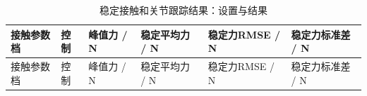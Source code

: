 \FloatBarrier\begingroup\small\setlength{\tabcolsep}{2.5pt}
\begin{longtable}[]{@{}
  >{\raggedright\arraybackslash}p{}
  >{\raggedright\arraybackslash}p{}
  >{\raggedright\arraybackslash}p{}
  >{\raggedright\arraybackslash}p{}
  >{\raggedright\arraybackslash}p{}
  >{\raggedright\arraybackslash}p{}@{}}
\caption{稳定接触和关节跟踪结果：设置与结果}\label{tab:s10-1}\tabularnewline
\toprule\noalign{}
\begin{minipage}[b]{\linewidth}\raggedright
接触参数档
\end{minipage} & \begin{minipage}[b]{\linewidth}\raggedright
控制
\end{minipage} & \begin{minipage}[b]{\linewidth}\raggedright
峰值力 / N
\end{minipage} & \begin{minipage}[b]{\linewidth}\raggedright
稳定平均力 / N
\end{minipage} & \begin{minipage}[b]{\linewidth}\raggedright
稳定力RMSE / N
\end{minipage} & \begin{minipage}[b]{\linewidth}\raggedright
稳定力标准差 / N
\end{minipage} \\
\midrule\noalign{}
\endfirsthead
\toprule\noalign{}
\begin{minipage}[b]{\linewidth}\raggedright
接触参数档
\end{minipage} & \begin{minipage}[b]{\linewidth}\raggedright
控制
\end{minipage} & \begin{minipage}[b]{\linewidth}\raggedright
峰值力 / N
\end{minipage} & \begin{minipage}[b]{\linewidth}\raggedright
稳定平均力 / N
\end{minipage} & \begin{minipage}[b]{\linewidth}\raggedright
稳定力RMSE / N
\end{minipage} & \begin{minipage}[b]{\linewidth}\raggedright
稳定力标准差 / N
\end{minipage} \\

\end{longtable}
